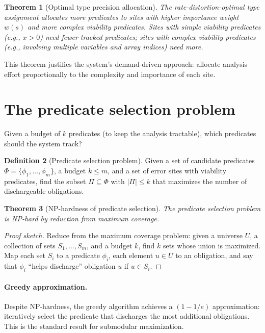 \documentclass[11pt]{report}
\theoremstyle{definition}
\newtheorem{definition}{Definition}[section]
\theoremstyle{plain}
\newtheorem{theorem}[definition]{Theorem}
\begin{document}
\begin{theorem}[Optimal type precision allocation]
The rate-distortion-optimal type assignment allocates more predicates to
sites with higher importance weight $w(s)$ and more complex viability
predicates. Sites with simple viability predicates (e.g., $x > 0$) need
fewer tracked predicates; sites with complex viability predicates (e.g.,
involving multiple variables and array indices) need more.
\end{theorem}

This theorem justifies the system's demand-driven approach: allocate
analysis effort proportionally to the complexity and importance of each site.

\section{The predicate selection problem}

Given a budget of $k$ predicates (to keep the analysis tractable), which
predicates should the system track?

\begin{definition}[Predicate selection problem]
Given a set of candidate predicates $\Phi = \{\phi_1, \ldots, \phi_m\}$, a
budget $k \leq m$, and a set of error sites with viability predicates, find
the subset $\Pi \subseteq \Phi$ with $|\Pi| \leq k$ that maximizes the
number of dischargeable obligations.
\end{definition}

\begin{theorem}[NP-hardness of predicate selection]
The predicate selection problem is NP-hard by reduction from maximum
coverage.
\end{theorem}

\begin{proof}[Proof sketch]
Reduce from the maximum coverage problem: given a universe $U$, a collection
of sets $S_1, \ldots, S_m$, and a budget $k$, find $k$ sets whose union is
maximized. Map each set $S_i$ to a predicate $\phi_i$, each element $u \in U$
to an obligation, and say that $\phi_i$ ``helps discharge'' obligation $u$
if $u \in S_i$.
\end{proof}

\paragraph{Greedy approximation.}
Despite NP-hardness, the greedy algorithm achieves a $(1 - 1/e)$
approximation: iteratively select the predicate that discharges the most
additional obligations. This is the standard result for submodular
maximization.
\end{document}
